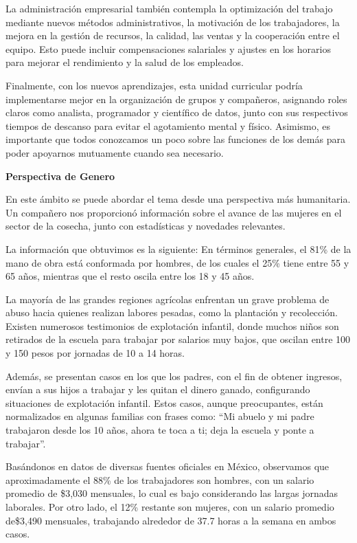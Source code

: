 \documentclass[12pt]{article}
\begin{document}
{{{{{{{{			La administración empresarial también contempla la optimización del trabajo mediante nuevos métodos administrativos, la motivación de los trabajadores, la mejora en la gestión de recursos, la calidad, las ventas y la cooperación entre el equipo. Esto puede incluir compensaciones salariales y ajustes en los horarios para mejorar el rendimiento y la salud de los empleados.
			
			Finalmente, con los nuevos aprendizajes, esta unidad curricular podría implementarse mejor en la organización de grupos y compañeros, asignando roles claros como analista, programador y científico de datos, junto con sus respectivos tiempos de descanso para evitar el agotamiento mental y físico. Asimismo, es importante que todos conozcamos un poco sobre las funciones de los demás para poder apoyarnos mutuamente cuando sea necesario.
			
		\newpage
	\begin{center}
		{\huge \textbf{Perspectiva de Genero}}
	\end{center}
	\vspace{1cm} 
	{\large %
			En este ámbito se puede abordar el tema desde una perspectiva más humanitaria. Un compañero nos proporcionó información sobre el avance de las mujeres en el sector de la cosecha, junto con estadísticas y novedades relevantes.
			
			La información que obtuvimos es la siguiente:
			En términos generales, el 81\% de la mano de obra está conformada por hombres, de los cuales el 25\% tiene entre 55 y 65 años, mientras que el resto oscila entre los 18 y 45 años.
			
			La mayoría de las grandes regiones agrícolas enfrentan un grave problema de abuso hacia quienes realizan labores pesadas, como la plantación y recolección. Existen numerosos testimonios de explotación infantil, donde muchos niños son retirados de la escuela para trabajar por salarios muy bajos, que oscilan entre 100 y 150 pesos por jornadas de 10 a 14 horas.
			
			Además, se presentan casos en los que los padres, con el fin de obtener ingresos, envían a sus hijos a trabajar y les quitan el dinero ganado, configurando situaciones de explotación infantil. Estos casos, aunque preocupantes, están normalizados en algunas familias con frases como: “Mi abuelo y mi padre trabajaron desde los 10 años, ahora te toca a ti; deja la escuela y ponte a trabajar”.
			
			Basándonos en datos de diversas fuentes oficiales en México, observamos que aproximadamente el 88\% de los trabajadores son hombres, con un salario promedio de \$3,030 mensuales, lo cual es bajo considerando las largas jornadas laborales. Por otro lado, el 12\% restante son mujeres, con un salario promedio de\$3,490 mensuales, trabajando alrededor de 37.7 horas a la semana en ambos casos.
			
}}}}}}}}}
\end{document}
